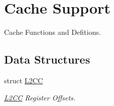 \hypertarget{group__L2C-310__cache}{}\section{Cache Support}
\label{group__L2C-310__cache}


Cache Functions and Defitions.  


\subsection*{Data Structures}
\begin{DoxyCompactItemize}
\item 
struct \mbox{\hyperlink{structL2CC}{L2\+CC}}
\begin{DoxyCompactList}\small\item\em \mbox{\hyperlink{structL2CC}{L2\+CC}} Register Offsets. \end{DoxyCompactList}\end{DoxyCompactItemize}
